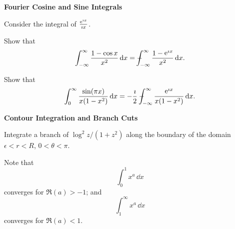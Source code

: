 {%
\begin{large}
  \noindent
  \textbf{Fourier Cosine and Sine Integrals}
\end{large}



\begin{Hint}
  \label{hint sin(x)/x}
  Consider the integral of $\frac{\mathop{\mathrm{e}}\nolimits^{\imath x}}{\imath x}$.
\end{Hint}


\begin{Hint}
  \label{hint (1-cos x)/x^2}
  Show that
  \[
  \int_{-\infty}^\infty \frac{1 - \cos x}{x^2} \,\mathrm{d} x 
  = - \negthickspace \negthickspace \negthickspace \negmedspace \int_{-\infty}^\infty \frac{1 - \mathop{\mathrm{e}}\nolimits^{\imath x}}{x^2}\,\mathrm{d} x.
  \]
\end{Hint}



\begin{Hint}
  \label{hint sin(pi x)/(x(1-x^2))}
  Show that
  \[
  \int_0^\infty \frac{\sin(\pi x)}{x(1-x^2)}\,\mathrm{d} x
  = - \frac{\imath}{2} - \negthickspace \negthickspace \negthickspace \negmedspace \int_{-\infty}^\infty \frac{\mathop{\mathrm{e}}\nolimits^{\imath x}}{x(1-x^2)}\,\mathrm{d} x.
  \]
\end{Hint}


\begin{large}
  \noindent
  \textbf{Contour Integration and Branch Cuts}
\end{large}



\begin{Hint}
  \label{hint int (ln x)^2 / (1 + x^2)}
  Integrate a branch of $\log^2 z / (1 + z^2)$ along the boundary of the domain
  $\epsilon < r < R$, $0 < \theta < \pi$.
\end{Hint}



\begin{Hint}
  \label{hint 1/(x^2+5x+6)}
\end{Hint}





\begin{Hint}
  \label{hint x^a/(x+1)^2}
  Note that
  \[
  \int_0^1 x^a \,\dd x
  \]
  converges for $\Re(a) > -1$; and 
  \[
  \int_1^\infty x^a \,\dd x
  \]
  converges for $\Re(a) < 1$.


\end{Hint}}

